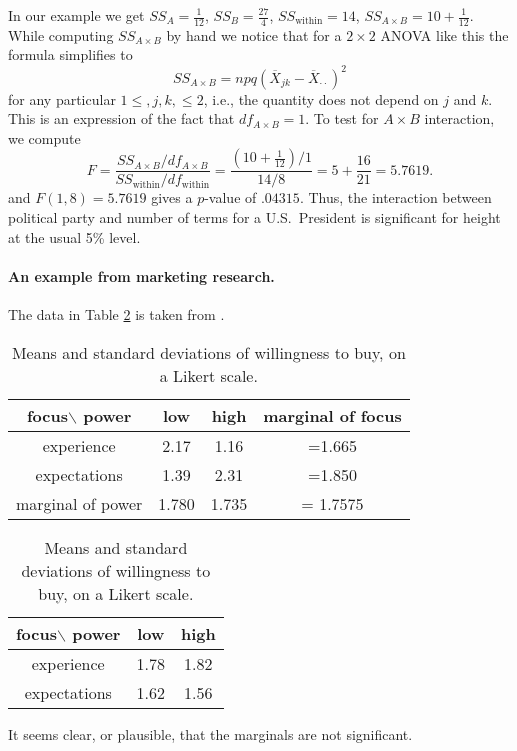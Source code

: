 In our example we get $SS_A=\frac1{12}$, $SS_B=\frac{27}4$, $SS_{\text{within}}=14$, $SS_{A\times B}=10+\frac1{12}$. While computing $SS_{A\times B}$ by hand we notice that for a $2\times 2$ ANOVA like this the formula simplifies to
\[
	SS_{A\times B} = npq (\overline X_{jk}-\overline X_{\cdot\cdot})^2
\]
for any particular $1\le ,j, k,\le 2$, i.e., the quantity does not depend on $j$ and $k$. This is an expression of the fact that $df_{A\times B}=1$.
To test for $A\times B$ interaction, we compute
\[
	F = \frac{SS_{A\times B}/df_{A\times B}}{SS_{\text{within}}/df_{\text{within}}} = \frac{(10+\frac1{12})/1}{14/8} = 5+\frac{16}{21} = 5.7619.
\]
and $F(1,8)=5.7619$ gives a $p$-value of $.04315$. Thus, the interaction between political party and number of terms for a U.S.~President is significant for height at the usual 5\% level.

\paragraph{An example from marketing research.}
The data in Table \ref{RuckerHuGalinsky} is taken from .
\begin{table}
\centering
\begin{tabular}{|c|c|c|c|}
\hline
focus$\backslash$ power	&	low	& high & marginal of focus\\
\hline
experience			& 	2.17 & 1.16 & =1.665\\
expectations			&	1.39 & 2.31 & =1.850\\
\hline
marginal of power		&	1.780 & 1.735 & = 1.7575\\
\hline
\end{tabular}
\begin{tabular}{|c|c|c|}
\hline
focus$\backslash$ power	&	low	& high \\
\hline
experience			& 	1.78 & 1.82 \\
expectations			&	1.62 & 1.56 \\
\hline
\end{tabular}
\caption{Means and standard deviations of willingness to buy, on a Likert scale.}\label{RuckerHuGalinsky}
\end{table}

It seems clear, or plausible, that the marginals are not significant.

